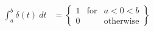 \documentclass[preview]{standalone}
\begin{document}
\begin{align*}
\int_{a}^{b} \delta(t) \ dt &=\left\{ \begin{array}{rcl} 1 & \textrm{for} & a<0<b \\ 0 & & \textrm{otherwise} \end{array} \right\}
\end{align*}
\end{document}
